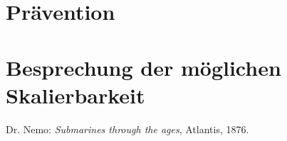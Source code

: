 \documentclass[a4paper,
DIV=13,
12pt,
BCOR=10mm,
department=FakIM,
oneside,
parskip=half,
automark,
listof=totocnumbered,
bibliography=totocnumbered,
acronym=totocnumbered
] {OTHRartcl}
\begin{document}
\section{Prävention}


\section{Besprechung der möglichen Skalierbarkeit}



\begin{appendix}
\listoffigures

\cleardoublepage
\begin{thebibliography}{99}
 Dr. Nemo: \textit{Submarines through the ages}, Atlantis, 1876.
\end{thebibliography}

\cleardoublepage
\makedeclaration
\end{appendix}
\end{document}

